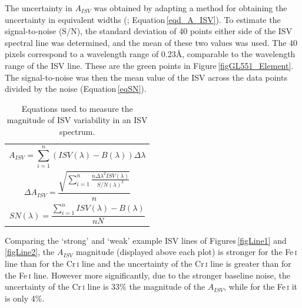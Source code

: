 The uncertainty in $A_{ISV}$ was obtained by adapting a method for obtaining the uncertainty in equivalent widths (\citealt{1995Ebbets}; Equation\,\ref{eqd_A_ISV}). To estimate the signal-to-noise (S/N), the standard deviation of 40 points either side of the ISV spectral line was determined, and the mean of these two values was used. The 40 pixels correspond to a wavelength range of 0.23\hbox{\AA}, comparable to the wavelength range of the ISV line. These are the green points in Figure\,\ref{figGL551_Element}. The signal-to-noise was then the mean value of the ISV across the data points divided by the noise (Equation\,\ref{eqSN}).\\




\begin{table}[]
    \centering
    \begin{tabular}{|c|}
    \hline
    \vbox{\begin{equation}A_{ISV} = \sum\limits_{i=1}^n (ISV(\lambda)-B(\lambda)) \Delta\lambda\label{eqA_ISV}\end{equation}}\\
    \vbox{\begin{equation}\Delta A_{ISV} = \frac{\sqrt{\sum\limits_{i=1}^n\frac{n\Delta\lambda^2 ISV(\lambda)}{S/N(\lambda)^2}}}{n}\label{eqd_A_ISV}\end{equation}}\\
    \vbox{\begin{equation}SN(\lambda) = \frac{\sum\limits_{i=1}^n ISV(\lambda)-B(\lambda)}{nN}\label{eqSN}\end{equation}}\\
    \hline
    \end{tabular}
    \caption{Equations used to measure the magnitude of ISV variability in an ISV spectrum.}
    \label{tabISVaisv}
\end{table}
Comparing the `strong' and `weak' example ISV lines of Figures\,\ref{figLine1} and \ref{figLine2}, the $A_{ISV}$ magnitude (displayed above each plot) is stronger for the Fe\,\textsc{i} line than for the Cr\,\textsc{i} line and the uncertainty of the Cr\,\textsc{i} line is greater than for the Fe\,\textsc{i} line. However more significantly, due to the stronger baseline noise, the uncertainty of the Cr\,\textsc{i} line is 33\% the magnitude of the $A_{ISV}$, while for the Fe\,\textsc{i} it is only 4\%.

